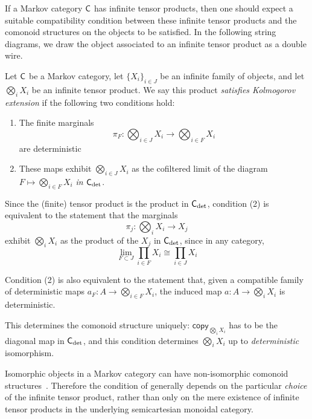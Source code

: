 \documentclass[11pt]{article}
\begin{document}
If a Markov category $\mathsf{C}$ has infinite tensor products, then one should expect a suitable compatibility condition between these infinite tensor products and the comonoid structures on the objects to be satisfied. In the following string diagrams, we draw the object associated to an infinite tensor product as a double wire.

\begin{definition}
    \label{defn_kolmogorov_ext}
    Let $\mathsf{C}$ be a Markov category, let $\{X_i\}_{i\in J}$ be an infinite family of objects, and let $\bigotimes_i X_i$ be an infinite tensor product.
    We say this product \emph{satisfies Kolmogorov extension} if the following two conditions hold:
    \begin{enumerate}[(1)]
        \item The finite marginals \[\pi_F: \bigotimes_{i\in J} X_i \to \bigotimes_{i \in F} X_i\] are deterministic
        \item These maps exhibit $\bigotimes_{i\in J} X_i$ as the cofiltered limit of the diagram $F \mapsto \bigotimes_{i \in F} X_i$ \emph{in $\mathsf{C}_{\rm det}$}.
    \end{enumerate}
\end{definition}


\begin{remark}
    Since the (finite) tensor product is the product in $\mathsf{C}_{\rm det}$, condition (2) is equivalent to the statement that the marginals
    \[\pi_j: \bigotimes_i X_i \to X_j\]
    exhibit $\bigotimes_i X_i$ as the product of the $X_j$ in $\mathsf{C}_{\rm det}$,
    since in any category, \[\lim_{F \subset J} \prod_{i \in F}X_i \cong \prod_{i \in J}X_i\]
\end{remark}

\begin{remark}
    Condition (2) is also equivalent to the statement that, given a compatible family of deterministic maps $a_F: A \to \bigotimes_{i \in F} X_i$, the induced map $a: A \to \bigotimes_i X_i$ is deterministic.
\end{remark}


This determines the comonoid structure uniquely: $\mathsf{copy}_{\bigotimes_i X_i}$ has to be the diagonal map in $\mathsf{C}_{\rm det}$,
and this condition determines $\bigotimes_i X_i$ up to \emph{deterministic} isomorphism.

\begin{remark}
    Isomorphic objects in a Markov category can have non-isomorphic comonoid structures~\cite[Remark~10.9]{markov_cats}.
    Therefore the condition of  generally depends on the particular \emph{choice} of the infinite tensor product, rather than only on the mere existence of infinite tensor products in the underlying semicartesian monoidal category.
\end{remark}
\end{document}
